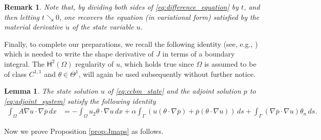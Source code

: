 \documentclass[a4paper,11pt]{article}
\newtheorem{remark}{Remark}
\newtheorem{lemma}[theorem]{Lemma}
\newcommand{\vect}[1]{\boldsymbol{\mathbf{#1}}}
\newcommand{\dotu}{\dot{u}}
\newcommand{\ui}{u_{2}}
\newcommand{\sfTheta}{\Theta}
\newcommand{\HH}{\vect{\mathsf{H}}}
\newcommand{\VV}{\theta}
\newcommand{\Vn}{\theta_{n}}
\newcommand{\intO}[1]{\int_{\varOmega}{#1}{\, {d}{x}}}
\newcommand{\intG}[1]{\int_{\varGamma}{#1}{\, {d}{s}}}
\begin{document}
%
\begin{remark}
Note that, by dividing both sides of \eqref{eq:difference_equation} by $t$, and then letting $t \searrow 0$, one recovers the equation (in variational form) satisfied by the material derivative $\dotu$ of the state variable $u$.
\end{remark}
%
%
Finally, to complete our preparations, we recall the following identity (see, e.g., \cite{DelfourZolesio2011}) which is needed to write the shape derivative of $J$ in terms of a boundary integral.
The $\HH^2(\varOmega)$ regularity of ${u}$, which holds true since $\varOmega$ is assumed to be of class ${C}^{1,1}$ and $\VV \in \sfTheta^1$, will again be used subsequently without further notice.	
%
%
%
\begin{lemma}
\label{eq:integral_equivalence}
The state solution $u$ of \eqref{eq:ccbm_state} and the adjoint solution $p$ to \eqref{eq:adjoint_system} satisfy the following identity
	\begin{equation} \label{eq:domain_identity}
	\begin{aligned}
	\intO{A \nabla {u} \cdot \nabla \overline{p}}
	&= - \intO{ \ui \VV \cdot \nabla {u} } 
		+ \alpha \intG{ \left( {u}(\VV \cdot \nabla \overline{{p}}) + \overline{p} (\VV \cdot \nabla {u}) \right) } 
		+ \intG{(\nabla \overline{{p}} \cdot \nabla {u})\Vn}.
	\end{aligned}
	\end{equation}
\end{lemma}
%
%
%
Now we prove Proposition \ref{prop:Jmaps} as follows.
\end{document}
